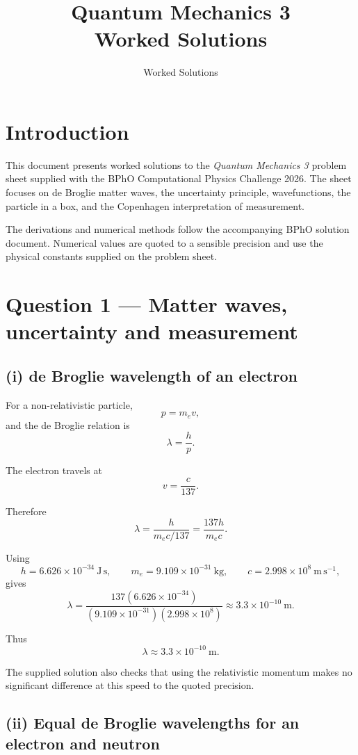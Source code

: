 \documentclass[11pt,a4paper]{article}
\title{\textbf{Quantum Mechanics 3}\\Worked Solutions}
\author{Worked Solutions}
\date{}
\begin{document}
\maketitle

\section*{Introduction}

This document presents worked solutions to the \emph{Quantum Mechanics 3} problem
sheet supplied with the BPhO Computational Physics Challenge 2026. The sheet
focuses on de Broglie matter waves, the uncertainty principle, wavefunctions,
the particle in a box, and the Copenhagen interpretation of measurement.

The derivations and numerical methods follow the accompanying BPhO solution
document. Numerical values are quoted to a sensible precision and use the
physical constants supplied on the problem sheet.

\section{Question 1 --- Matter waves, uncertainty and measurement}

\subsection{(i) de Broglie wavelength of an electron}

For a non-relativistic particle,
\[
p=m_ev,
\]
and the de Broglie relation is
\[
\lambda=\frac{h}{p}.
\]

The electron travels at
\[
v=\frac{c}{137}.
\]

Therefore
\[
\lambda
=
\frac{h}{m_ec/137}
=
\frac{137h}{m_ec}.
\]

Using
\[
h=6.626\times10^{-34}\ \mathrm{J\,s},
\qquad
m_e=9.109\times10^{-31}\ \mathrm{kg},
\qquad
c=2.998\times10^8\ \mathrm{m\,s^{-1}},
\]
gives
\[
\lambda
=
\frac{137(6.626\times10^{-34})}
{(9.109\times10^{-31})(2.998\times10^8)}
\approx3.3\times10^{-10}\ \mathrm m.
\]

Thus
\[
\boxed{\lambda\approx3.3\times10^{-10}\ \mathrm m}.
\]

The supplied solution also checks that using the relativistic momentum makes no
significant difference at this speed to the quoted precision.

\subsection{(ii) Equal de Broglie wavelengths for an electron and neutron}
\end{document}
